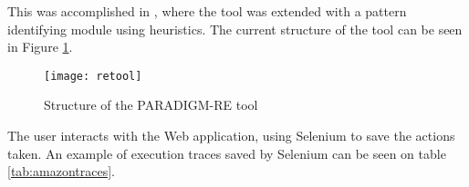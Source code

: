 This was accomplished in \cite{nabuco2014inferring}, where the tool was extended with a pattern identifying module using heuristics. The current structure of the tool can be seen in Figure \ref{fig:retool}. 

\begin{figure}[htb]
  \begin{center}
    \leavevmode
    \texttt{[image: retool]}
  	\caption[Structure of the PARADIGM-RE tool]{Structure of the PARADIGM-RE tool \cite{nabuco2014inferring}}
  	\label{fig:retool}
   \end{center}
\end{figure}

The user interacts with the Web application, using Selenium to save the actions taken. An example of execution traces saved by Selenium can be seen on table \ref{tab:amazontraces}. 


